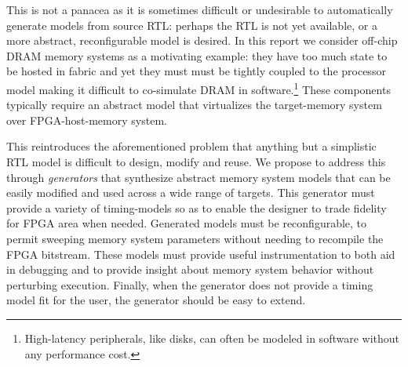 This is not a panacea as it is sometimes difficult or undesirable to
automatically generate models from source RTL: perhaps the RTL is not yet
available, or a more abstract, reconfigurable model is desired. In this report
we consider off-chip DRAM memory systems as a motivating example: they have too
much state to be hosted in fabric and yet they must must be tightly coupled to
the processor model making it difficult to co-simulate DRAM in
software.\footnote{High-latency peripherals, like disks, can often be modeled
in software without any performance cost.\cite{disksim}} These components
typically require an abstract model that virtualizes the target-memory system
over FPGA-host-memory system.

This reintroduces the aforementioned problem that anything but a simplistic RTL
model is difficult to design, modify and reuse. We propose to address this
through \emph{generators} that synthesize abstract memory system models that
can be easily modified and used across a wide range of targets.  This generator
must provide a variety of timing-models so as to enable the designer to trade
fidelity for FPGA area when needed. Generated models must be reconfigurable, to
permit sweeping memory system parameters without needing to recompile the FPGA
bitstream. These models must provide useful instrumentation to both aid in
debugging and to provide insight about memory system behavior without
perturbing execution. Finally, when the generator does not provide a timing
model fit for the user, the generator should be easy to extend.
